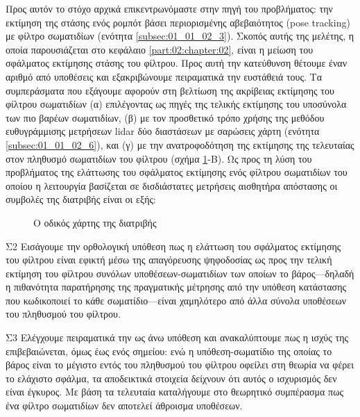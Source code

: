 Προς αυτόν το στόχο αρχικά επικεντρωνόμαστε στην πηγή του προβλήματος: την
εκτίμηση της στάσης ενός ρομπότ βάσει περιορισμένης αβεβαιότητος (pose
tracking) με φίλτρο σωματιδίων (ενότητα \ref{subsec:01_01_02_3}). Σκοπός αυτής
της μελέτης, η οποία παρουσιάζεται στο κεφάλαιο \ref{part:02:chapter:02}, είναι
η μείωση του σφάλματος εκτίμησης στάσης του φίλτρου. Προς αυτή την κατεύθυνση
θέτουμε έναν αριθμό από υποθέσεις και εξακριβώνουμε πειραματικά την ευστάθειά
τους. Τα συμπεράσματα που εξάγουμε αφορούν στη βελτίωση της ακρίβειας εκτίμησης
του φίλτρου σωματιδίων (α) επιλέγοντας ως πηγές της τελικής εκτίμησης του
υποσύνολα των πιο βαρέων σωματιδίων, (β) με τον προσθετικό τρόπο χρήσης της
μεθόδου ευθυγράμμισης μετρήσεων lidar δύο διαστάσεων με σαρώσεις χάρτη (ενότητα
\ref{subsec:01_01_02_6}), και (γ) με την ανατροφοδότηση της εκτίμησης της
τελευταίας στον πληθυσμό σωματιδίων του φίλτρου (σχήμα \ref{fig:roadmap}-Β). Ως
προς τη λύση του προβλήματος της ελάττωσης του σφάλματος εκτίμησης ενός φίλτρου
σωματιδίων του οποίου η λειτουργία βασίζεται σε δισδιάστατες μετρήσεις
αισθητήρα απόστασης οι συμβολές της διατριβής είναι οι εξής:


\begin{figure}\hspace{-2cm}
  
  \caption{\small Ο οδικός χάρτης της διατριβής}
  \label{fig:roadmap}
\end{figure}

\begin{bw_box}
\begin{customcontribution}{Σ2}
  \label{contribution:02}
  Εισάγουμε την ορθολογική υπόθεση πως η ελάττωση του σφάλματος εκτίμησης του
  φίλτρου είναι εφικτή μέσω της απαγόρευσης ψηφοδοσίας ως προς την τελική
  εκτίμηση του φίλτρου συνόλων υποθέσεων-σωματιδίων των οποίων το
  βάρος---δηλαδή η πιθανότητα παρατήρησης της πραγματικής μέτρησης από την
  υπόθεση κατάστασης που κωδικοποιεί το κάθε σωματίδιο---είναι χαμηλότερο από
  άλλα σύνολα υποθέσεων του πληθυσμού του φίλτρου. \cite{Filotheou2020c}
\end{customcontribution}
\end{bw_box}

\begin{bw_box}
\begin{customcontribution}{Σ3}
  \label{contribution:03}
  Ελέγχουμε πειραματικά την ως άνω υπόθεση και ανακαλύπτουμε πως η ισχύς της
  επιβεβαιώνεται, όμως έως ενός σημείου: ενώ η υπόθεση-σωματίδιο της οποίας το
  βάρος είναι το μέγιστο εντός του πληθυσμού του φίλτρου οφείλει στη θεωρία να
  φέρει το ελάχιστο σφάλμα, τα αποδεικτικά στοιχεία δείχνουν ότι αυτός ο
  ισχυρισμός δεν είναι έγκυρος. Με βάση τα τελευταία καταλήγουμε στο θεωρητικό
  συμπέρασμα πως ένα φίλτρο σωματιδίων δεν αποτελεί άθροισμα υποθέσεων.
\end{customcontribution}
\end{bw_box}

